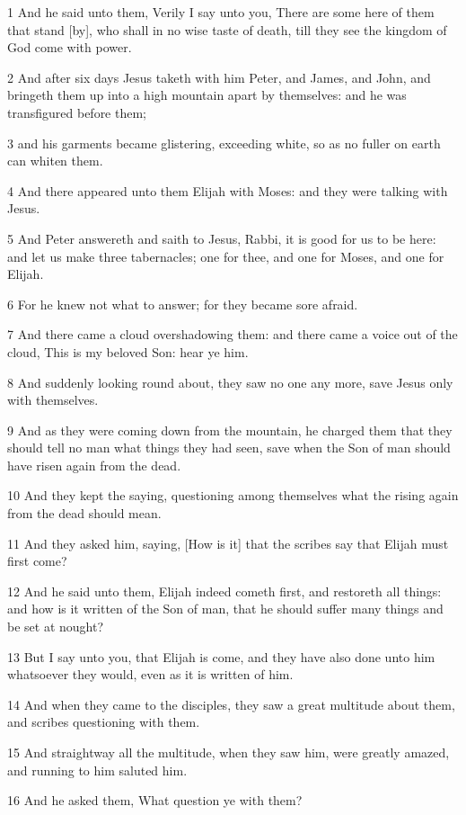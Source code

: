 \par 1 And he said unto them, Verily I say unto you, There are some here of them that stand [by], who shall in no wise taste of death, till they see the kingdom of God come with power.
\par 2 And after six days Jesus taketh with him Peter, and James, and John, and bringeth them up into a high mountain apart by themselves: and he was transfigured before them;
\par 3 and his garments became glistering, exceeding white, so as no fuller on earth can whiten them.
\par 4 And there appeared unto them Elijah with Moses: and they were talking with Jesus.
\par 5 And Peter answereth and saith to Jesus, Rabbi, it is good for us to be here: and let us make three tabernacles; one for thee, and one for Moses, and one for Elijah.
\par 6 For he knew not what to answer; for they became sore afraid.
\par 7 And there came a cloud overshadowing them: and there came a voice out of the cloud, This is my beloved Son: hear ye him.
\par 8 And suddenly looking round about, they saw no one any more, save Jesus only with themselves.
\par 9 And as they were coming down from the mountain, he charged them that they should tell no man what things they had seen, save when the Son of man should have risen again from the dead.
\par 10 And they kept the saying, questioning among themselves what the rising again from the dead should mean.
\par 11 And they asked him, saying, [How is it] that the scribes say that Elijah must first come?
\par 12 And he said unto them, Elijah indeed cometh first, and restoreth all things: and how is it written of the Son of man, that he should suffer many things and be set at nought?
\par 13 But I say unto you, that Elijah is come, and they have also done unto him whatsoever they would, even as it is written of him.
\par 14 And when they came to the disciples, they saw a great multitude about them, and scribes questioning with them.
\par 15 And straightway all the multitude, when they saw him, were greatly amazed, and running to him saluted him.
\par 16 And he asked them, What question ye with them?
